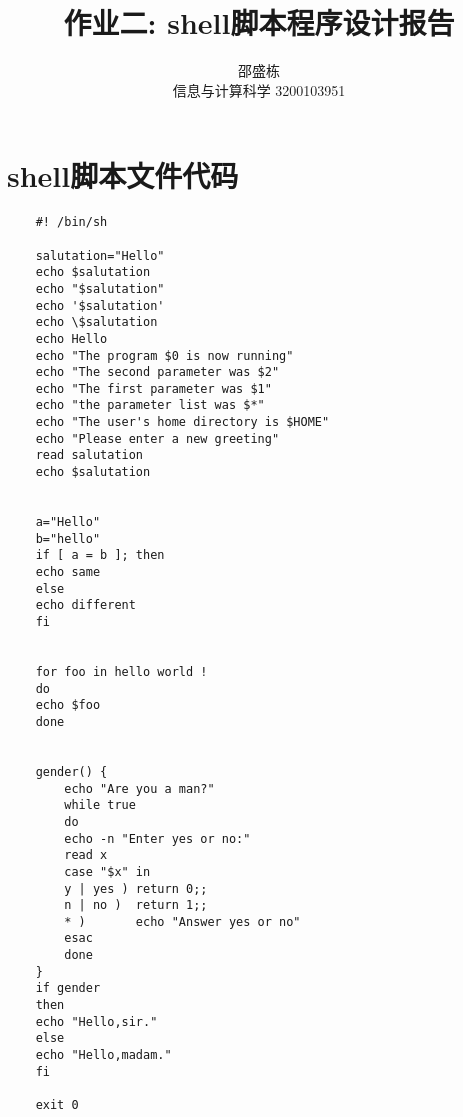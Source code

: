 \documentclass{ctexart}
\title{作业二: shell脚本程序设计报告}
\author{邵盛栋 \\ 信息与计算科学 3200103951}
\begin{document}
	
	\maketitle
	\newpage
\section*{shell脚本文件代码}
\begin{verbatim}
	#! /bin/sh
	
	salutation="Hello"
	echo $salutation
	echo "$salutation"
	echo '$salutation'
	echo \$salutation
	echo Hello
	echo "The program $0 is now running"
	echo "The second parameter was $2"
	echo "The first parameter was $1"
	echo "the parameter list was $*"
	echo "The user's home directory is $HOME"
	echo "Please enter a new greeting"
	read salutation
	echo $salutation
	
	
	a="Hello"
	b="hello"
	if [ a = b ]; then
	echo same
	else
	echo different
	fi
	
	
	for foo in hello world !
	do
	echo $foo
	done
	
	
	gender() {
		echo "Are you a man?"
		while true
		do
		echo -n "Enter yes or no:"
		read x
		case "$x" in
		y | yes ) return 0;;
		n | no )  return 1;;
		* )       echo "Answer yes or no"
		esac
		done
	}
	if gender
	then
	echo "Hello,sir."
	else
	echo "Hello,madam."
	fi
	
	exit 0
\end{verbatim}
\end{document}
